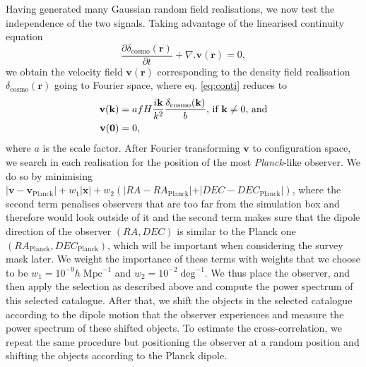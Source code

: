 \documentclass[a4paper,11pt]{article}
\begin{document}
 Having generated many Gaussian random field realisations, we now test the independence of the two signals. Taking advantage of the linearised continuity equation
\begin{equation}
    \frac{\partial\delta_\mathrm{cosmo}(\mathbf{r})}{\partial t} + \nabla.\mathbf{v}(\mathbf{r}) = 0,
    \label{eq:conti}
\end{equation}
we  obtain the velocity field $\mathbf{v}(\mathbf{r})$ corresponding to the density field realisation $\delta_\mathrm{cosmo}(\mathbf{r})$ going to Fourier space, where eq. \eqref{eq:conti} reduces to 
\begin{align}
    \mathbf{v}(\mathbf{k}) &= afH\frac{i\mathbf{k}}{k^2}\frac{\delta_\mathrm{cosmo}(\mathbf{k})}{b}\text{, if }\mathbf{k}\neq 0\text{, and}\\
    \mathbf{v}({\bf 0}) &= 0,\nonumber
\end{align}
where $a$ is the scale factor. After Fourier transforming $\mathbf{v}$ to configuration space, we search in each realisation for the position of the most \textit{Planck}-like observer. We do so by minimising $\vert \mathbf{v} - \mathbf{v}_\mathrm{Planck}\vert + w_1\vert \mathbf{x}\vert + w_2\left(\vert RA - RA_\mathrm{Planck}\vert + \vert DEC - DEC_\mathrm{Planck}\vert\right)$, where the second term penalises observers that are too far from the simulation box and therefore would look outside of it and the second term makes sure that the dipole direction of the observer $(RA, DEC)$ is similar to the Planck one $(RA_\mathrm{Planck}, DEC_\mathrm{Planck})$, which will be important when considering the survey mask later. We weight the importance of these terms with weights that we choose to be  $w_1 = 10^{-9}h\;\mathrm{Mpc}^{-1}$ and $w_2 = 10^{-2}\;\mathrm{deg}^{-1}$. We thus place the observer, and then apply the selection as described above and compute the power spectrum of this selected catalogue. After that, we shift the objects in the selected catalogue according to the dipole motion that the observer experiences and measure the power spectrum of these shifted objects. To estimate the cross-correlation, we repeat the same procedure but positioning the observer at a random position and shifting the objects according to the Planck dipole.
\end{document}
